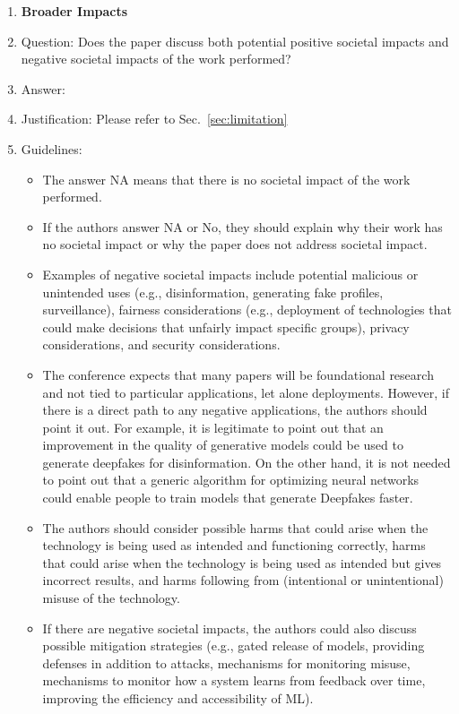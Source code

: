 \documentclass{article}
\begin{document}
\begin{enumerate}
\item {\bf Broader Impacts}
    \item[] Question: Does the paper discuss both potential positive societal impacts and negative societal impacts of the work performed?
    \item[] Answer: \answerYes{} %
    \item[] Justification: Please refer to Sec.~\ref{sec:limitation}
    \item[] Guidelines:
    \begin{itemize}
        \item The answer NA means that there is no societal impact of the work performed.
        \item If the authors answer NA or No, they should explain why their work has no societal impact or why the paper does not address societal impact.
        \item Examples of negative societal impacts include potential malicious or unintended uses (e.g., disinformation, generating fake profiles, surveillance), fairness considerations (e.g., deployment of technologies that could make decisions that unfairly impact specific groups), privacy considerations, and security considerations.
        \item The conference expects that many papers will be foundational research and not tied to particular applications, let alone deployments. However, if there is a direct path to any negative applications, the authors should point it out. For example, it is legitimate to point out that an improvement in the quality of generative models could be used to generate deepfakes for disinformation. On the other hand, it is not needed to point out that a generic algorithm for optimizing neural networks could enable people to train models that generate Deepfakes faster.
        \item The authors should consider possible harms that could arise when the technology is being used as intended and functioning correctly, harms that could arise when the technology is being used as intended but gives incorrect results, and harms following from (intentional or unintentional) misuse of the technology.
        \item If there are negative societal impacts, the authors could also discuss possible mitigation strategies (e.g., gated release of models, providing defenses in addition to attacks, mechanisms for monitoring misuse, mechanisms to monitor how a system learns from feedback over time, improving the efficiency and accessibility of ML).
    \end{itemize}
    

\end{enumerate}
\end{document}
